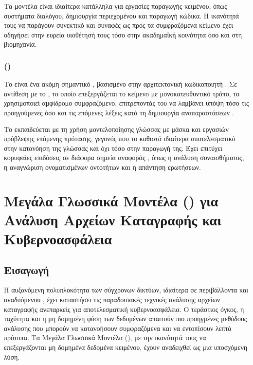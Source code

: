 Τα μοντέλα  είναι ιδιαίτερα κατάλληλα για εργασίες παραγωγής κειμένου, όπως συστήματα διαλόγου, δημιουργία περιεχομένου και παραγωγή κώδικα. Η ικανότητά τους να παράγουν συνεκτικό και συναφές ως προς τα συμφραζόμενα κείμενο έχει οδηγήσει στην ευρεία υιοθέτησή τους τόσο στην ακαδημαϊκή κοινότητα όσο και στη βιομηχανία.

\subsubsection{ ()}

Το  είναι ένα ακόμη σημαντικό , βασισμένο στην αρχιτεκτονική κωδικοποιητή . Σε αντίθεση με το , το οποίο επεξεργάζεται το κείμενο με μονοκατευθυντικό τρόπο, το  χρησιμοποιεί αμφίδρομο συμφραζόμενο, επιτρέποντάς του να λαμβάνει υπόψη τόσο τις προηγούμενες όσο και τις επόμενες λέξεις κατά τη δημιουργία αναπαραστάσεων \cite{devlin2019bert}.

Το  εκπαιδεύεται με τη χρήση μοντελοποίησης γλώσσας με μάσκα και εργασιών πρόβλεψης επόμενης πρότασης, γεγονός που το καθιστά ιδιαίτερα αποτελεσματικό στην κατανόηση της γλώσσας και όχι τόσο στην παραγωγή της. Έχει επιτύχει κορυφαίες επιδόσεις σε διάφορα σημεία αναφοράς , όπως η ανάλυση συναισθήματος, η αναγνώριση ονοματισμένων οντοτήτων και η απάντηση ερωτήσεων.

\section{Μεγάλα Γλωσσικά Μοντέλα () για Ανάλυση Αρχείων Καταγραφής και Κυβερνοασφάλεια}

\subsection{Εισαγωγή}

Η αυξανόμενη πολυπλοκότητα των σύγχρονων δικτύων, ιδιαίτερα σε περιβάλλοντα  και αναδυόμενου , έχει καταστήσει τις παραδοσιακές τεχνικές ανάλυσης αρχείων καταγραφής ανεπαρκείς για αποτελεσματική κυβερνοασφάλεια. Ο τεράστιος όγκος, η ταχύτητα και η μη δομημένη φύση των δεδομένων απαιτούν πιο προηγμένες μεθόδους ανάλυσης που μπορούν να κατανοήσουν συμφραζόμενα και να εντοπίσουν λεπτά πρότυπα. Τα Μεγάλα Γλωσσικά Μοντέλα (), με την ικανότητά τους να επεξεργάζονται μη δομημένα δεδομένα κειμένου, έχουν αναδειχθεί ως μια υποσχόμενη λύση.

